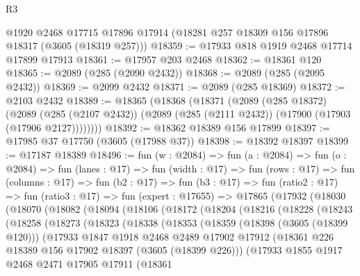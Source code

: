 \begin{lexlean}{R3}
\begin{coremodule}
    @1920
    @2468
    @17715
    @17896
    @17914
    (@18281 @257 @18309 @156 @17896 @18317 (@3605 (@18319 @257)))
@18359 := @17933 @818 @1919 @2468 @17714 @17899 @17913
@18361 := @17957 @203 @2468
@18362 := @18361 @120
@18365 := @2089 (@285 (@2090 @2432))
@18368 := @2089 (@285 (@2095 @2432))
@18369 := @2099 @2432
@18371 := @2089 (@285 @18369)
@18372 := @2103 @2432
@18389 := @18365
    (@18368
      (@18371
        (@2089
          (@285 @18372)
          (@2089
            (@285 (@2107 @2432))
            (@2089 (@285 (@2111 @2432)) (@17900 (@17903 (@17906 @2127))))))))
@18392 := @18362 @18389 @156 @17899
@18397 := @17985 @37 @17750 (@3605 (@17988 @37))
@18398 := @18392 @18397
@18399 := @17187 @18389
@18496 := fun (w : @2084) =>
  fun (a : @2084) =>
  fun (o : @2084) =>
  fun (lanes : @17) =>
  fun (width : @17) =>
  fun (rows : @17) =>
  fun (columns : @17) =>
  fun (b2 : @17) =>
  fun (b3 : @17) =>
  fun (ratio2 : @17) =>
  fun (ratio3 : @17) =>
  fun (expert : @17655) =>
  @17865
    (@17932
      (@18030
        (@18070
          (@18082
            (@18094
              (@18106
                (@18172
                  (@18204
                    (@18216
                      (@18228
                        (@18243
                          (@18258
                            (@18273
                              (@18323
                                (@18338
                                  (@18353
                                    (@18359
                                      (@18398 (@3605 (@18399 @120)))
                                      (@17933
                                        @1847
                                        @1918
                                        @2468
                                        @2489
                                        @17902
                                        @17912
                                        (@18361
                                          @226
                                          @18389
                                          @156
                                          @17902
                                          @18397
                                          (@3605 (@18399 @226)))
                                        (@17933
                                          @1855
                                          @1917
                                          @2468
                                          @2471
                                          @17905
                                          @17911
                                          (@18361

\end{coremodule}
\end{lexlean}
